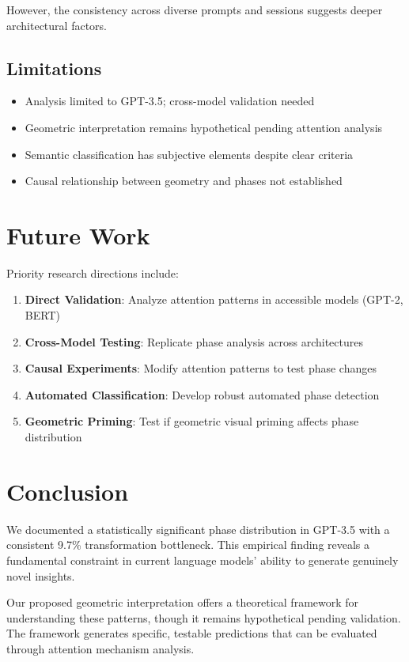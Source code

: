 \documentclass[pmlr,onecolumn]{jmlr}
\begin{document}
However, the consistency across diverse prompts and sessions suggests deeper architectural factors.

\subsection{Limitations}

\begin{itemize}
\item Analysis limited to GPT-3.5; cross-model validation needed
\item Geometric interpretation remains hypothetical pending attention analysis
\item Semantic classification has subjective elements despite clear criteria
\item Causal relationship between geometry and phases not established
\end{itemize}

\section{Future Work}

Priority research directions include:

\begin{enumerate}
\item \textbf{Direct Validation}: Analyze attention patterns in accessible models (GPT-2, BERT)
\item \textbf{Cross-Model Testing}: Replicate phase analysis across architectures
\item \textbf{Causal Experiments}: Modify attention patterns to test phase changes
\item \textbf{Automated Classification}: Develop robust automated phase detection
\item \textbf{Geometric Priming}: Test if geometric visual priming affects phase distribution
\end{enumerate}

\section{Conclusion}

We documented a statistically significant phase distribution in GPT-3.5 with a consistent 9.7\% transformation bottleneck. This empirical finding reveals a fundamental constraint in current language models' ability to generate genuinely novel insights.

Our proposed geometric interpretation offers a theoretical framework for understanding these patterns, though it remains hypothetical pending validation. The framework generates specific, testable predictions that can be evaluated through attention mechanism analysis.
\end{document}
